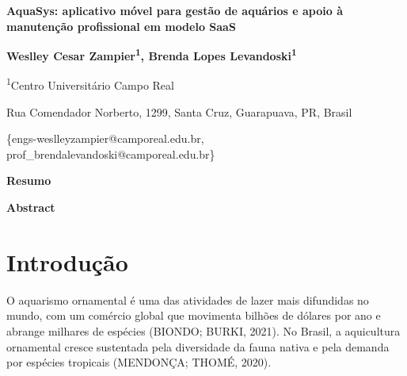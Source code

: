 \documentclass[12pt,oneside,a4paper,brazilian]{abntex2}
\begin{document}
\begingroup
\SingleSpacing
\setlength{\parindent}{0pt}
\begin{center}
{\bfseries\fontsize{13pt}{22.5pt}\selectfont
 AquaSys: aplicativo móvel para gestão de aquários e apoio à
 manutenção profissional em modelo SaaS\par}

\vspace{8pt}

{\bfseries\fontsize{11pt}{13.2pt}\selectfont
 Weslley Cesar Zampier\textsuperscript{1},
 Brenda Lopes Levandoski\textsuperscript{1}\par}

\vspace{18pt}

{\fontsize{12pt}{13.8pt}\selectfont
 \textsuperscript{1}Centro Universitário Campo Real\par
 Rua Comendador Norberto, 1299, Santa Cruz, Guarapuava, PR, Brasil\par
 \vspace{6pt}
 \{engs-weslleyzampier@camporeal.edu.br,
   prof\_brendalevandoski@camporeal.edu.br\}\par}
\end{center}
\endgroup

\vspace{18pt}

\begingroup\SingleSpacing
\setlength{\parindent}{0pt}
\noindent\textbf{Resumo}\par\vspace{6pt}
\par\vspace{12pt}
\noindent\textbf{Abstract}\par\vspace{6pt}
\endgroup

\section{Introdução}
O aquarismo ornamental é uma das atividades de lazer mais difundidas no mundo, com um comércio global que movimenta bilhões de dólares por ano e abrange milhares de espécies (BIONDO; BURKI, 2021). No Brasil, a aquicultura ornamental cresce sustentada pela diversidade da fauna nativa e pela demanda por espécies tropicais (MENDONÇA; THOMÉ, 2020).
\end{document}
